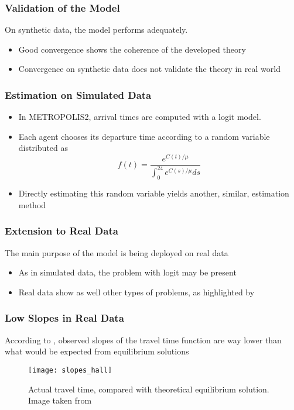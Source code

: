 \documentclass[hyperref={pdfpagelabels=false}]{beamer}
\begin{document}
\begin{frame}
  \frametitle{Validation of the Model}
  On synthetic data, the model performs adequately.
  \begin{itemize}
  \item<2-> Good convergence shows the coherence of the developed theory
  \item<3-> Convergence on synthetic data does not validate the theory in real world
  \end{itemize}
\end{frame}

\begin{frame}
  \frametitle{Estimation on Simulated Data}
  \begin{itemize}
  \item In METROPOLIS2, arrival times are computed with a logit model.
  \item Each agent chooses its departure time according to a random variable distributed as
    \begin{equation*}
      f(t) = \frac{e^{C(t)/\mu}}{\int_0^{24} e^{C(s)/\mu} ds}
    \end{equation*}
  \item Directly estimating this random variable yields another, similar, estimation method 
  \end{itemize}
\end{frame}

\begin{frame}
  \frametitle{Extension to Real Data}
  The main purpose of the model is being deployed on real data
  \begin{itemize}
  \item<2-> As in simulated data, the problem with logit may be present
  \item<3-> Real data show as well other types of problems, as highlighted by \textcite{https://doi.org/10.1111/iere.12692}
  \end{itemize}
\end{frame}

\begin{frame}
  \frametitle{Low Slopes in Real Data}
  According to \textcite{https://doi.org/10.1111/iere.12692},
  observed slopes of the travel time function are way lower than what would be expected from equilibrium solutions
  \begin{figure}
    \centering
    \texttt{[image: slopes\_hall]}
    \caption{Actual travel time, compared with theoretical equilibrium solution. Image taken from \textcite{https://doi.org/10.1111/iere.12692}}
  \end{figure}
\end{frame}
\end{document}
